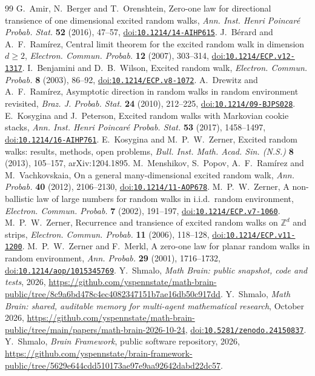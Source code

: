 \documentclass[11pt]{amsart}
\theoremstyle{remark}
\newcommand{\Z}{\mathbb{Z}}
\newcommand{\doi}[1]{\href{https://doi.org/#1}{doi:\nolinkurl{#1}}}
\begin{document}
\begin{thebibliography}{99}
 G.~Amir, N.~Berger and T.~Orenshtein, Zero-one law for directional transience of one dimensional excited
random walks, \emph{Ann. Inst. Henri Poincar\'e Probab. Stat.} \textbf{52} (2016), 47--57, \doi{10.1214/14-AIHP615}.
 J.~B\'erard and A.~F.~Ram\'irez, Central limit theorem for the excited random walk in dimension
$d\ge2$, \emph{Electron. Commun. Probab.} \textbf{12} (2007), 303--314, \doi{10.1214/ECP.v12-1317}.
 I.~Benjamini and D.~B.~Wilson, Excited random walk, \emph{Electron. Commun. Probab.} \textbf{8} (2003),
86--92, \doi{10.1214/ECP.v8-1072}.
 A.~Drewitz and A.~F.~Ram\'irez, Asymptotic direction in random walks in random environment
revisited, \emph{Braz. J. Probab. Stat.} \textbf{24} (2010), 212--225, \doi{10.1214/09-BJPS028}.
 E.~Kosygina and J.~Peterson, Excited random walks with Markovian cookie stacks, \emph{Ann. Inst. Henri
Poincar\'e Probab. Stat.} \textbf{53} (2017), 1458--1497, \doi{10.1214/16-AIHP761}.
 E.~Kosygina and M.~P.~W.~Zerner, Excited random walks: results, methods, open problems, \emph{Bull. Inst.
Math. Acad. Sin. (N.S.)} \textbf{8} (2013), 105--157, arXiv:1204.1895.
 M.~Menshikov, S.~Popov, A.~F.~Ram\'irez and M.~Vachkovskaia, On a general many-dimensional excited
random walk, \emph{Ann. Probab.} \textbf{40} (2012), 2106--2130, \doi{10.1214/11-AOP678}.
 M.~P.~W.~Zerner, A non-ballistic law of large numbers for random walks in i.i.d.\ random environment,
\emph{Electron. Commun. Probab.} \textbf{7} (2002), 191--197, \doi{10.1214/ECP.v7-1060}.
 M.~P.~W.~Zerner, Recurrence and transience of excited random walks on $\Z^d$ and strips,
\emph{Electron. Commun. Probab.} \textbf{11} (2006), 118--128, \doi{10.1214/ECP.v11-1200}.
 M.~P.~W.~Zerner and F.~Merkl, A zero-one law for planar random walks in random environment,
\emph{Ann. Probab.} \textbf{29} (2001), 1716--1732, \doi{10.1214/aop/1015345769}.
 Y.~Shmalo, \emph{Math Brain: public snapshot, code and tests}, 2026,
\url{https://github.com/yspennstate/math-brain-public/tree/8c9a6bd478c4ec4082347151b7ae16db50c917dd}.
 Y.~Shmalo, \emph{Math Brain: shared, auditable memory for multi-agent mathematical research},
October 2026, \url{https://github.com/yspennstate/math-brain-public/tree/main/papers/math-brain-2026-10-24},
\doi{10.5281/zenodo.24150837}.
 Y.~Shmalo, \emph{Brain Framework}, public software repository, 2026,
\url{https://github.com/yspennstate/brain-framework-public/tree/5629e644cdd510173ae97e9aa92642dabd22dc57}.
\end{thebibliography}
\end{document}
